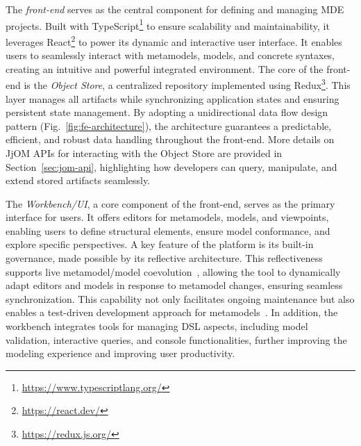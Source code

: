 \medskip\noindent
The \textit{front-end} serves as the central component for defining and managing MDE projects. Built with TypeScript\footnote{\url{https://www.typescriptlang.org/}} to ensure scalability and maintainability, it leverages React\footnote{\url{https://react.dev/}} to power its dynamic and interactive user interface. It enables users to seamlessly interact with metamodels, models, and concrete syntaxes, creating an intuitive and powerful integrated environment.
%
The core of the front-end is the \textit{\jjodel{} Object Store}, a centralized repository implemented using Redux\footnote{\url{https://redux.js.org/}}. This layer manages all artifacts while synchronizing application states and ensuring persistent state management. By adopting a unidirectional data flow design pattern (Fig.~\ref{fig:fe-architecture}), the architecture guarantees a predictable, efficient, and robust data handling throughout the front-end.
%
More details on JjOM APIs for interacting with the \jjodel{} Object Store are provided in Section~\ref{sec:jom-api}, highlighting how developers can query, manipulate, and extend stored artifacts seamlessly.


The \textit{\jjodel{} Workbench/UI}, a core component of the front-end, serves as the primary interface for users. It offers editors for metamodels, models, and viewpoints, enabling users to define structural elements, ensure model conformance, and explore specific perspectives. A key feature of the platform is its built-in governance, made possible by its reflective architecture. This reflectiveness supports live metamodel/model coevolution~\cite{cicchetti2008automating}, allowing the tool to dynamically adapt editors and models in response to metamodel changes, ensuring seamless synchronization. This capability not only facilitates ongoing maintenance but also enables a test-driven development approach for metamodels~\cite{cicchetti2012test}.
%
In addition, the workbench integrates tools for managing DSL aspects, including model validation, interactive queries, and console functionalities, further improving the modeling experience and improving user productivity.

